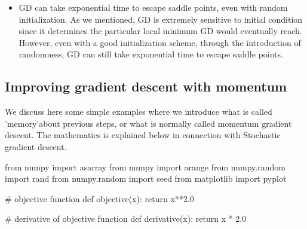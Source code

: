 \documentclass[%
oneside,                 %
final,                   %
10pt]{article}
\begin{document}
\begin{itemize}
\item GD can take exponential time to escape saddle points, even with random initialization. As we mentioned, GD is extremely sensitive to initial condition since it determines the particular local minimum GD would eventually reach. However, even with a good initialization scheme, through the introduction of randomness, GD can still take exponential time to escape saddle points.
\end{itemize}

\noindent
\subsection{Improving gradient descent with momentum}

We discuss here some simple examples where we introduce what is called 'memory'about previous steps, or what is normally called momentum gradient descent. The mathematics is explained below in connection with Stochastic gradient descent.


























































\bpycod
from numpy import asarray
from numpy import arange
from numpy.random import rand
from numpy.random import seed
from matplotlib import pyplot
 
# objective function
def objective(x):
	return x**2.0
 
# derivative of objective function
def derivative(x):
	return x * 2.0
 
\end{document}
